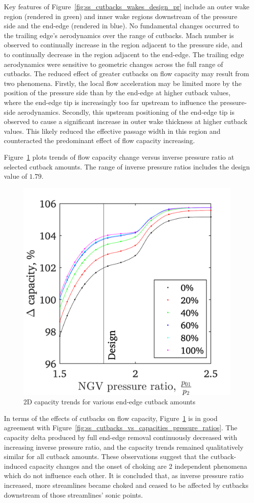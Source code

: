 \documentclass[a4paper, 11pt, oneside]{report}
\begin{document}
Key features of Figure~\ref{fig:ss_cutbacks_wakes_design_pr} include an outer wake region (rendered in green) and inner wake regions downstream of the pressure side and the end-edge (rendered in blue). No fundamental changes occurred to the trailing edge's aerodynamics over the range of cutbacks. Mach number is observed to continually increase in the region adjacent to the pressure side, and to continually decrease in the region adjacent to the end-edge. The trailing edge aerodynamics were sensitive to geometric changes across the full range of cutbacks. The reduced effect of greater cutbacks on flow capacity may result from two phenomena. Firstly, the local flow acceleration may be limited more by the position of the pressure side than by the end-edge at higher cutback values, where the end-edge tip is increasingly too far upstream to influence the pressure-side aerodynamics. Secondly, this upstream positioning of the end-edge tip is observed to cause a significant increase in outer wake thickness at higher cutback values. This likely reduced the effective passage width in this region and counteracted the predominant effect of flow capacity increasing.

Figure~\ref{fig:ss_cutbacks_vs_capacities_trends} plots trends of flow capacity change versus inverse pressure ratio at selected cutback amounts. The range of inverse pressure ratios includes the design value of $1.79$.

\begin{figure}[H]
	\centering
	\includegraphics[width=.45\textwidth]{figs/ss_cutbacks_vs_capacities_trends.png}
	\caption{2D capacity trends for various end-edge cutback amounts}
    \label{fig:ss_cutbacks_vs_capacities_trends}
\end{figure}

In terms of the effects of cutbacks on flow capacity, Figure~\ref{fig:ss_cutbacks_vs_capacities_trends} is in good agreement with Figure~\ref{fig:ss_cutbacks_vs_capacities_pressure_ratios}. The capacity delta produced by full end-edge removal continuously decreased with increasing inverse pressure ratio, and the capacity trends remained qualitatively similar for all cutback amounts. These observations suggest that the cutback-induced capacity changes and the onset of choking are 2 independent phenomena which do not influence each other. It is concluded that, as inverse pressure ratio increased, more streamlines became choked and ceased to be affected by cutbacks downstream of those streamlines' sonic points. 
\end{document}

